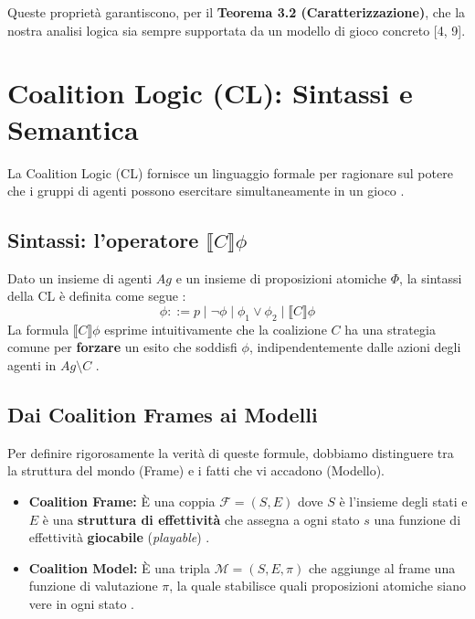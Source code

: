 \documentclass[12pt]{article}
\newcommand{\CL}[1]{\llbracket #1 \rrbracket}
\begin{document}
Queste proprietà garantiscono, per il \textbf{Teorema 3.2 (Caratterizzazione)},
che la nostra analisi logica sia sempre supportata da un modello di gioco
concreto [4, 9].

\section{Coalition Logic (CL): Sintassi e Semantica}

La Coalition Logic (CL) fornisce un linguaggio formale per ragionare sul potere
che i gruppi di agenti possono esercitare simultaneamente in un gioco
.

\subsection{Sintassi: l'operatore $\CL{C} \phi$}

Dato un insieme di agenti $Ag$ e un insieme di proposizioni atomiche $\Phi$,
la sintassi della CL è definita come segue :
\begin{equation}
	\phi ::= p \mid \neg \phi \mid \phi_1 \lor \phi_2 \mid \CL{C} \phi
\end{equation}
La formula $\CL{C} \phi$ esprime intuitivamente che la coalizione $C$ ha una
strategia comune per \textbf{forzare} un esito che soddisfi $\phi$,
indipendentemente dalle azioni degli agenti in $Ag \setminus C$ .

\subsection{Dai Coalition Frames ai Modelli}

Per definire rigorosamente la verità di queste formule, dobbiamo distinguere
tra la struttura del mondo (Frame) e i fatti che vi accadono (Modello).

\begin{itemize}
	\item \textbf{Coalition Frame:} È una coppia $\mathcal{F} = (S, E)$ dove
	      $S$ è l'insieme degli stati e $E$ è una \textbf{struttura di effettività}
	      che assegna a ogni stato $s$ una funzione di effettività \textbf{giocabile}
	      (\textit{playable}) .
	\item \textbf{Coalition Model:} È una tripla $\mathcal{M} = (S, E, \pi)$
	      che aggiunge al frame una funzione di valutazione $\pi$, la quale stabilisce
	      quali proposizioni atomiche siano vere in ogni stato .
\end{itemize}
\end{document}
